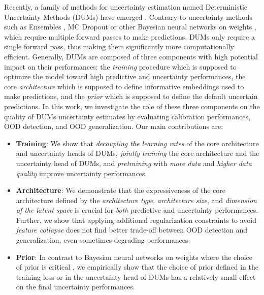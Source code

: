 Recently, a family of methods for uncertainty estimation named Deterministic Uncertainty Methods (DUMs) have emerged \citep{postels2022practicalitydum}. 
Contrary to uncertainty methods such as Ensembles \citep{lakshminarayanan2017ensembles}, MC Dropout \citep{gal2016dropout} or other Bayesian neural networks on weights \citep{blundell2015weight}, which require multiple forward passes to make predictions, DUMs only require a single forward pass, thus making them significantly more computationally efficient. 
Generally, DUMs are composed of three components with high potential impact on their performances: the \emph{training} procedure which is supposed to optimize the model toward high predictive and uncertainty performances,  the core \emph{architecture} which is supposed to define informative embeddings used to make predictions, and the \emph{prior} which is supposed to define the default uncertain predictions. In this work, we investigate the role of these three components on the quality of DUMs uncertainty estimates by evaluating calibration performances, OOD detection, and OOD generalization. Our main contributions are:
\vspace{-2mm}
\begin{itemize}
    \item \textbf{Training}: We show that \emph{decoupling the learning rates} of the core architecture and uncertainty heads of DUMs, \emph{jointly training} the core architecture and the uncertainty head of DUMs, and \emph{pretraining} with \emph{more data} and \emph{higher data quality} improve uncertainty performances. 
    \item \textbf{Architecture}: We demonstrate that the expressiveness of the core architecture defined by the \emph{architecture type}, \emph{architecture size}, and \emph{dimension of the latent space} is crucial for \emph{both} predictive and uncertainty performances. Further, we show that applying additional regularization constraints to avoid \emph{feature collapse} does not find better trade-off between OOD detection and generalization, even sometimes degrading performances.
    \item \textbf{Prior}: In contrast to Bayesian neural networks on weights where the choice of prior is critical \citep{wenzel2020prior_cpe, fortuin2022prior, noci2021prior_cpe, kapoor2022prior_cpe}, we empirically show that the choice of prior defined in the training loss or in the uncertainty head of DUMs has a relatively small effect on the final uncertainty performances.
\end{itemize}
